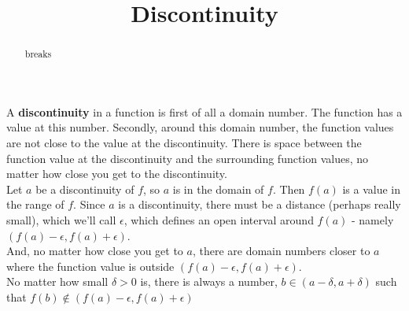 \documentclass{ximera}
\title{Discontinuity}
\begin{document}
\begin{abstract}
breaks
\end{abstract}
\maketitle











A \textbf{discontinuity} in a function is first of all a domain number.  The function has a value at this number. Secondly, around this domain number, the function values are not close to the value at the discontinuity. There is space between the function value at the discontinuity and the surrounding function values, no matter how close you get to the discontinuity. \\












Let $a$ be a discontinuity of $f$, so $a$ is in the domain of $f$.   Then $f(a)$ is a value in the range of $f$. Since $a$ is a discontinuity, there must be a distance (perhaps really small), which we'll call $\epsilon$, which defines an open interval around $f(a)$ - namely $(f(a)-\epsilon, f(a)+\epsilon)$.  \\


And, no matter how close you get to $a$, there are domain numbers closer to $a$ where the function value is outside $(f(a)-\epsilon, f(a)+\epsilon)$. \\



No matter how small $\delta>0$ is, there is always a number, $b \in (a-\delta, a+\delta)$ such that $ f(b) \not\in(f(a)-\epsilon, f(a)+\epsilon)$ \\
\end{document}
